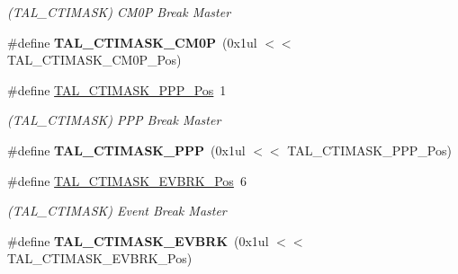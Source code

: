 \begin{DoxyCompactItemize}
\begin{DoxyCompactList}\small\item\em (T\+A\+L\+\_\+\+C\+T\+I\+M\+A\+S\+K) C\+M0\+P Break Master \end{DoxyCompactList}\item 
\hypertarget{group___s_a_m_l21___t_a_l_ga764e8aafec9c27113e750c91a53954c9}{}\#define {\bfseries T\+A\+L\+\_\+\+C\+T\+I\+M\+A\+S\+K\+\_\+\+C\+M0\+P}~(0x1ul $<$$<$ T\+A\+L\+\_\+\+C\+T\+I\+M\+A\+S\+K\+\_\+\+C\+M0\+P\+\_\+\+Pos)\label{group___s_a_m_l21___t_a_l_ga764e8aafec9c27113e750c91a53954c9}

\item 
\hypertarget{group___s_a_m_l21___t_a_l_gae95353d4b9d3c14ec91f2f9c44117b5b}{}\#define \hyperlink{group___s_a_m_l21___t_a_l_gae95353d4b9d3c14ec91f2f9c44117b5b}{T\+A\+L\+\_\+\+C\+T\+I\+M\+A\+S\+K\+\_\+\+P\+P\+P\+\_\+\+Pos}~1\label{group___s_a_m_l21___t_a_l_gae95353d4b9d3c14ec91f2f9c44117b5b}

\begin{DoxyCompactList}\small\item\em (T\+A\+L\+\_\+\+C\+T\+I\+M\+A\+S\+K) P\+P\+P Break Master \end{DoxyCompactList}\item 
\hypertarget{group___s_a_m_l21___t_a_l_gad66164180316fb4499f1d177a9944ec0}{}\#define {\bfseries T\+A\+L\+\_\+\+C\+T\+I\+M\+A\+S\+K\+\_\+\+P\+P\+P}~(0x1ul $<$$<$ T\+A\+L\+\_\+\+C\+T\+I\+M\+A\+S\+K\+\_\+\+P\+P\+P\+\_\+\+Pos)\label{group___s_a_m_l21___t_a_l_gad66164180316fb4499f1d177a9944ec0}

\item 
\hypertarget{group___s_a_m_l21___t_a_l_gad2288a209a51e969c2ceb31c788225a8}{}\#define \hyperlink{group___s_a_m_l21___t_a_l_gad2288a209a51e969c2ceb31c788225a8}{T\+A\+L\+\_\+\+C\+T\+I\+M\+A\+S\+K\+\_\+\+E\+V\+B\+R\+K\+\_\+\+Pos}~6\label{group___s_a_m_l21___t_a_l_gad2288a209a51e969c2ceb31c788225a8}

\begin{DoxyCompactList}\small\item\em (T\+A\+L\+\_\+\+C\+T\+I\+M\+A\+S\+K) Event Break Master \end{DoxyCompactList}\item 
\hypertarget{group___s_a_m_l21___t_a_l_ga45492e85c56ee565d0ae783b3dd02800}{}\#define {\bfseries T\+A\+L\+\_\+\+C\+T\+I\+M\+A\+S\+K\+\_\+\+E\+V\+B\+R\+K}~(0x1ul $<$$<$ T\+A\+L\+\_\+\+C\+T\+I\+M\+A\+S\+K\+\_\+\+E\+V\+B\+R\+K\+\_\+\+Pos)\label{group___s_a_m_l21___t_a_l_ga45492e85c56ee565d0ae783b3dd02800}


\end{DoxyCompactItemize}
